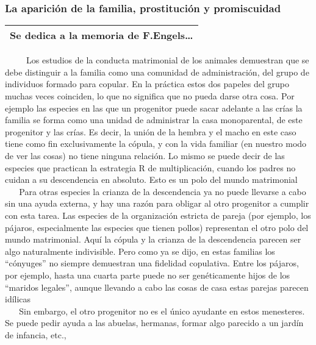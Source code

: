 \protect\hypertarget{M15A}{}{}

\subsubsection{La aparición de la familia, prostitución y
promiscuidad}\label{la-apariciuxf3n-de-la-familia-prostituciuxf3n-y-promiscuidad}

\begin{longtable}[]{@{}l@{}}
\toprule
Se dedica a la memoria de F.Engels\ldots{}\tabularnewline
\bottomrule
\end{longtable}

~ ~ ~ Los estudios de la conducta matrimonial de los animales demuestran
que se debe distinguir a la familia como una comunidad de
administración, del grupo de individuos formado para copular. En la
práctica estos dos papeles del grupo muchas veces coinciden, lo que no
significa que no pueda darse otra cosa. Por ejemplo las especies en las
que un progenitor puede sacar adelante a las crías la familia se forma
como una unidad de administrar la casa monoparental, de este progenitor
y las crías. Es decir, la unión de la hembra y el macho en este caso
tiene como fin exclusivamente la cópula, y con la vida familiar (en
nuestro modo de ver las cosas) no tiene ninguna relación. Lo mismo se
puede decir de las especies que practican la estrategia R de
multiplicación, cuando los padres no cuidan a su descendencia en
absoluto. Esto es un polo del mundo matrimonial\\
\hspace*{0.333em} ~ ~ Para otras especies la crianza de la descendencia
ya no puede llevarse a cabo sin una ayuda externa, y hay una razón para
obligar al otro progenitor a cumplir con esta tarea. Las especies de la
organización estricta de pareja (por ejemplo, los pájaros, especialmente
las especies que tienen pollos) representan el otro polo del mundo
matrimonial. Aquí la cópula y la crianza de la descendencia parecen ser
algo naturalmente indivisible. Pero como ya se dijo, en estas familias
los ``cónyuges'' no siempre demuestran una fidelidad copulativa. Entre
los pájaros, por ejemplo, hasta una cuarta parte puede no ser
genéticamente hijos de los ``maridos legales'', aunque llevando a cabo
las cosas de casa estas parejas parecen idílicas\\
\hspace*{0.333em} ~ ~ Sin embargo, el otro progenitor no es el único
ayudante en estos menesteres. Se puede pedir ayuda a las abuelas,
hermanas, formar algo parecido a un jardín de infancia, etc.,
